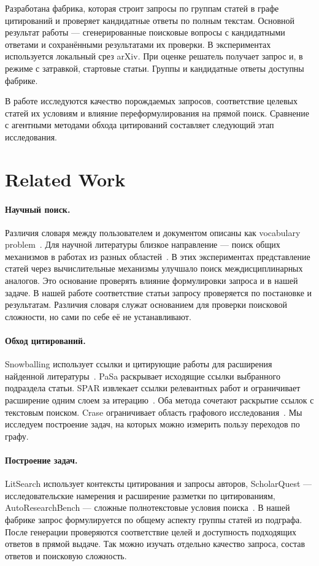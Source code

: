 Разработана фабрика, которая строит запросы по группам статей в графе цитирований и проверяет кандидатные ответы по полным текстам. Основной результат работы --- сгенерированные поисковые вопросы с кандидатными ответами и сохранёнными результатами их проверки. В экспериментах используется локальный срез arXiv. При оценке решатель получает запрос и, в режиме с затравкой, стартовые статьи. Группы и кандидатные ответы доступны фабрике.

В работе исследуются качество порождаемых запросов, соответствие целевых статей их условиям и влияние переформулирования на прямой поиск. Сравнение с агентными методами обхода цитирований составляет следующий этап исследования.

\section{Related Work}\label{sec:rw}

\paragraph{Научный поиск.}
Различия словаря между пользователем и документом описаны как vocabulary problem~\cite{furnas1987vocabulary}. Для научной литературы близкое направление --- поиск общих механизмов в работах из разных областей~\cite{kulikowski2026sameproblem}. В этих экспериментах представление статей через вычислительные механизмы улучшало поиск междисциплинарных аналогов. Это основание проверять влияние формулировки запроса и в нашей задаче. В нашей работе соответствие статьи запросу проверяется по постановке и результатам. Различия словаря служат основанием для проверки поисковой сложности, но сами по себе её не устанавливают.

\paragraph{Обход цитирований.}
Snowballing использует ссылки и цитирующие работы для расширения найденной литературы~\cite{wohlin2014snowballing}. PaSa раскрывает исходящие ссылки выбранного подраздела статьи. SPAR извлекает ссылки релевантных работ и ограничивает расширение одним слоем за итерацию~\cite{he2025pasa,shi2025spar}. Оба метода сочетают раскрытие ссылок с текстовым поиском. Crase ограничивает область графового исследования~\cite{hazra2026crase}. Мы исследуем построение задач, на которых можно измерить пользу переходов по графу.

\paragraph{Построение задач.}
LitSearch использует контексты цитирования и запросы авторов, ScholarQuest --- исследовательские намерения и расширение разметки по цитированиям, AutoResearchBench --- сложные полнотекстовые условия поиска~\cite{ajith2024litsearch,pan2026scholarquest,xiong2026autoresearchbench}. В нашей фабрике запрос формулируется по общему аспекту группы статей из подграфа. После генерации проверяются соответствие целей и доступность подходящих ответов в прямой выдаче. Так можно изучать отдельно качество запроса, состав ответов и поисковую сложность.

